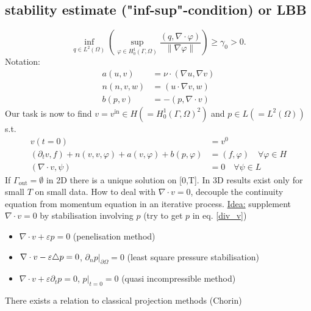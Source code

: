 \subsection{stability estimate ("inf-sup"-condition) or LBB}
\begin{equation*}
	\inf_{q \in L^2(\Omega)} \left(  \sup_{\varphi \in H^1_0(\Gamma,\Omega)} \frac{(q,\nabla \cdot \varphi )}{\|\nabla\varphi\|} \right) \geq \gamma_0 > 0.
\end{equation*}
Notation:
\begin{align*}
	a(u,v) &= \nu \cdot (\nabla u, \nabla v)\\
	n(n,v,w)&= (u \cdot \nabla v, w)\\
	b(p,v)&= -(p,\nabla\cdot v)
\end{align*}
Our task is now to find $v = v^{\text{in}} \in H (=H^1_0(\Gamma,\Omega)^2)$ and $p \in L (=L^2(\Omega))$ s.t. 
\begin{align}
	v(t=0) &= v^0 \nonumber\\
	(\partial_tv,f) + n(v,v,\varphi) + a(v,\varphi) + b(p,\varphi) &= (f,\varphi)\quad \forall \varphi \in H\nonumber\\
	(\nabla \cdot v, \psi) &= 0 \quad \forall \psi \in L \label{div_v}
\end{align}
If $\Gamma_{\text{out}} = \emptyset $ in 2D there is a unique solution on [0,T]. In 3D results exist only for small $T$ on small data. How to deal with $\nabla\cdot v= 0$, decouple the continuity equation from momentum equation in an iterative process.\nl
\underline{Idea:} supplement $\nabla \cdot v =0$ by stabilisation involving $p$ (try to get $p$ in eq. \eqref{div_v})
\begin{itemize}
	\item $\nabla \cdot v + \varepsilon p =0$ (penelisation method)
	\item $\nabla \cdot v - \varepsilon\triangle p =0$, $\partial_n p|_{\partial\Omega}=0$ (least square pressure stabilisation)
	\item $\nabla \cdot v + \varepsilon \partial_t p =0$, $p|_{t=0}=0$ (quasi incompressible method)
\end{itemize}
There exists a relation to classical projection methods (Chorin)
